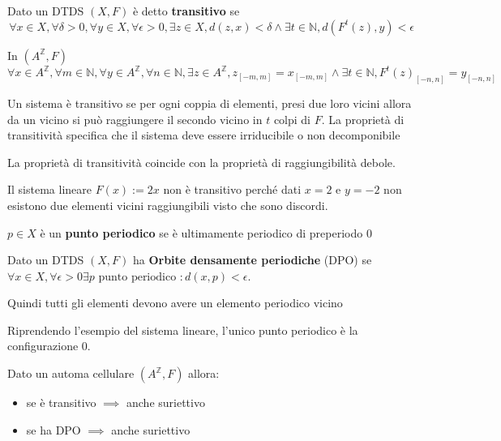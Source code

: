 \begin{definizione}
    Dato un DTDS $(X,F)$ è detto \textbf{transitivo} se
    $$\forall x\in X,\forall \delta >0, \forall y\in X,\forall \epsilon>0, \exists
        z\in X, d(z,x)< \delta \land \exists t\in \mathbb{N},d(F^t(z),y)<\epsilon$$

    In $(A^\mathbb{Z},F)$
    $$\forall x\in A^\mathbb{Z},\forall m \in\mathbb{N}, \forall y\in A^\mathbb{Z},\forall n\in\mathbb{N}, \exists
        z\in A^\mathbb{Z}, z_{[-m,m]} = x_{[-m,m]} \land \exists t\in \mathbb{N},F^t(z)_{[-n,n]} = y_{[-n,n]}$$

\end{definizione}
Un sistema è transitivo se per ogni coppia di elementi, presi due loro vicini allora
da un vicino si può raggiungere il secondo vicino in $t$ colpi di $F$. La proprietà
di transitività specifica che il sistema deve essere irriducibile o non decomponibile

\begin{nota}
    La proprietà di transitività coincide con la proprietà di raggiungibilità debole.
\end{nota}

\begin{esempio}
    Il sistema lineare $F(x):= 2x$ non è transitivo perché dati $x=2$ e $y=-2$
    non esistono due elementi vicini raggiungibili visto che sono discordi.
\end{esempio}

\begin{definizione}
    $p\in X$ è un \textbf{punto periodico} se è ultimamente periodico di preperiodo
    $0$
\end{definizione}

\begin{definizione} 
    Dato un DTDS $(X,F)$ ha \textbf{Orbite densamente periodiche} (DPO) se
    $\forall x\in X, \forall \epsilon>0 \exists p \text{ punto periodico }:  d(x,p)<\epsilon$.

    Quindi tutti gli elementi devono avere un elemento periodico vicino
\end{definizione}

\begin{esempio}
    Riprendendo l'esempio del sistema lineare, l'unico punto periodico è la configurazione $0$.
\end{esempio}
\begin{teorema}
    Dato un automa cellulare $(A^\mathbb{Z},F)$ allora:
    \begin{itemize}
        \item se è transitivo $\implies$ anche suriettivo
        \item se ha DPO $\implies$ anche suriettivo
    \end{itemize}
\end{teorema}

